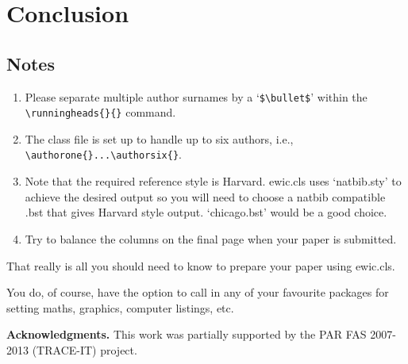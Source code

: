 \documentclass{ewic}
\begin{document}
\section{Conclusion}
%



\pagebreak
\subsection{Notes}
\begin{enumerate}
\item Please separate multiple author surnames by a `\verb+$\bullet$+' within the
\verb+\runningheads{}{}+ command.

\item The class file is set up to handle up to six authors, i.e., \verb+\authorone{}...\authorsix{}+.

\item Note that the required reference style is Harvard. ewic.cls
uses `natbib.sty' to achieve the desired output so you will need
to choose a natbib compatible .bst that gives Harvard style
output. `chicago.bst' would be a good choice.

\item Try to balance the columns on the final page when your paper is submitted.
\end{enumerate}

That really is all you should need to know to prepare your paper
using ewic.cls.\citep{Mills2003}

You do, of course, have the option to call in any of your
favourite packages for setting maths, graphics, computer listings,
etc.

\textbf{Acknowledgments. }
This work was partially supported by the PAR FAS 2007-2013 (TRACE-IT) project.

%
%
%
%



\end{document}
